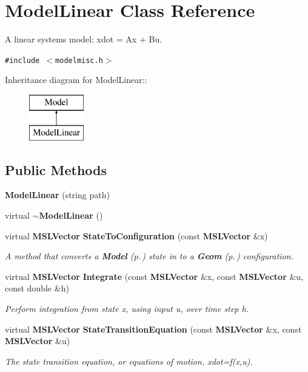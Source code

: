 \section{Model\-Linear  Class Reference}
\label{class_ModelLinear}
A linear systems model: xdot = Ax + Bu. 


{\tt \#include $<$modelmisc.h$>$}

Inheritance diagram for Model\-Linear::\begin{figure}[H]
\begin{center}
\leavevmode
\includegraphics[height=2cm]{class_ModelLinear}
\end{center}
\end{figure}
\subsection*{Public Methods}
\begin{CompactItemize}
\item 
{\bf Model\-Linear} (string path)
\item 
virtual {\bf $\sim$Model\-Linear} ()
\item 
virtual {\bf MSLVector} {\bf State\-To\-Configuration} (const {\bf MSLVector} \&x)
\begin{CompactList}\small\item\em A method that converts a {\bf Model} {\rm (p.\,\pageref{class_Model})} state in to a {\bf Geom} {\rm (p.\,\pageref{class_Geom})} configuration.\item\end{CompactList}\item 
virtual {\bf MSLVector} {\bf Integrate} (const {\bf MSLVector} \&x, const {\bf MSLVector} \&u, const double \&h)
\begin{CompactList}\small\item\em Perform integration from state x, using input u, over time step h.\item\end{CompactList}\item 
virtual {\bf MSLVector} {\bf State\-Transition\-Equation} (const {\bf MSLVector} \&x, const {\bf MSLVector} \&u)
\begin{CompactList}\small\item\em The state transition equation, or equations of motion, xdot=f(x,u).\item\end{CompactList}\end{CompactItemize}
